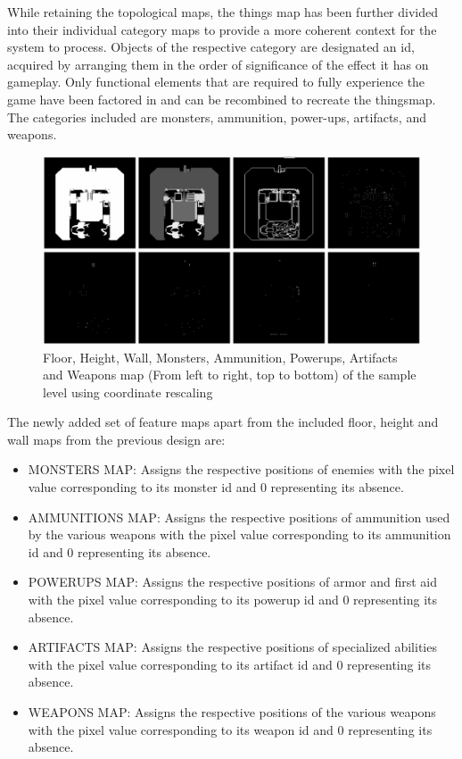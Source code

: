 \documentclass{Configuration_Files/PoliMi3i_thesis}
\begin{document}
While retaining the topological maps, the things map has been further divided into 
their individual category maps to provide a more coherent context for the system to 
process. Objects of the respective category are designated an id, acquired by 
arranging them in the order of significance of the effect it has on gameplay. Only 
functional elements that are required to fully experience the game have been factored 
in and can be recombined to recreate the thingsmap. The categories included are
monsters, ammunition, power-ups, artifacts, and weapons.
\begin{figure}[H]
    \centering
    \includegraphics[width=1\textwidth]{new_feature_maps.jpg}
    \caption[Updated feature maps of a sample level]{Floor, Height, Wall, Monsters, Ammunition, Powerups, Artifacts and 
Weapons map (From left to right, top to bottom) of the sample level using coordinate rescaling}
    \label{fig:newfeaturemaps}
\end{figure}
The newly added set of feature maps apart from the included floor, height and wall 
maps from the previous design are:
\begin{itemize}
\item MONSTERS MAP: Assigns the respective positions of enemies with the pixel 
value corresponding to its monster id and 0 representing its absence.
\item AMMUNITIONS MAP: Assigns the respective positions of ammunition used by 
the various weapons with the pixel value corresponding to its ammunition id 
and 0 representing its absence.
\item POWERUPS MAP: Assigns the respective positions of armor and first aid with 
the pixel value corresponding to its powerup id and 0 representing its 
absence.
\item ARTIFACTS MAP: Assigns the respective positions of specialized abilities 
with the pixel value corresponding to its artifact id and 0 representing its 
absence.
\item WEAPONS MAP: Assigns the respective positions of the various weapons 
with the pixel value corresponding to its weapon id and 0 representing its 
absence.
\end{itemize}
\end{document}
